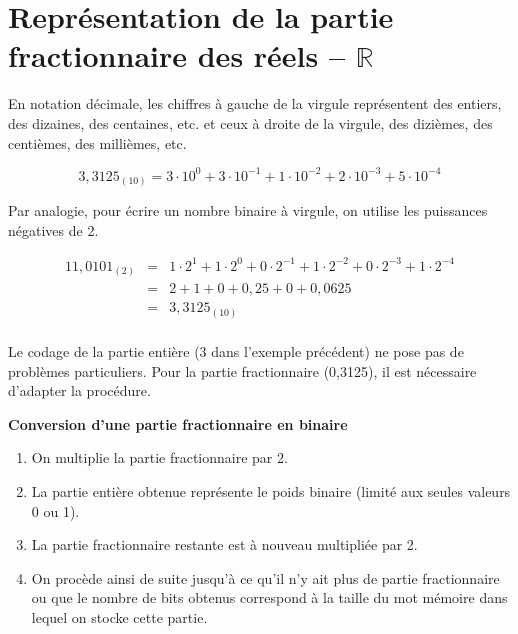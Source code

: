 \documentclass[10pt,fleqn]{article} %
\begin{document}




\section{Représentation de la partie fractionnaire des réels -- $\mathbb{R}$}

En notation décimale, les chiffres à gauche de la virgule représentent des entiers, des dizaines, des centaines, etc. et ceux à droite de la virgule, des dizièmes, des centièmes, des millièmes, etc.


\begin{exemple}
$$
3,3125_{ (10)}	=	3\cdot 10^0 + 3\cdot10^{- 1} + 1\cdot10^{- 2} + 2\cdot10^{ -3} + 5\cdot10^{ -4}
$$
\end{exemple}

Par analogie, pour écrire un nombre binaire à virgule, on utilise les puissances négatives de 2.

\begin{exemple}
\begin{eqnarray*}
11,0101_{(2)} &=&	1\cdot 2^{1} + 1\cdot 2^{0} + 0\cdot 2^{-1} + 1\cdot 2^{- 2} + 0\cdot 2^{-3} + 1\cdot 2^{- 4}\\
		 &=&    2   +   1   +    0    +   0,25  +     0     +   0,0625\\
		 &=&   3,3125_{(10)}\\
\end{eqnarray*}
\end{exemple}


Le codage de la partie entière (3 dans l’exemple précédent) ne pose pas de problèmes particuliers. Pour la partie fractionnaire (0,3125), il est nécessaire d’adapter la procédure.

\begin{methode}
\textbf{Conversion d'une partie fractionnaire en binaire}

\begin{enumerate}
\item On multiplie la partie fractionnaire par 2. 
\item La partie entière obtenue représente le poids binaire (limité aux seules valeurs 0 ou 1). 
\item La partie fractionnaire restante est à nouveau multipliée par 2.
\item On procède ainsi de suite jusqu’à ce qu’il n’y ait plus de partie fractionnaire ou que le nombre de bits obtenus correspond à la taille du mot mémoire dans lequel on stocke cette partie.
\end{enumerate}
\end{methode}
\end{document}
